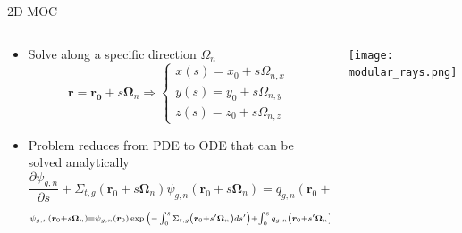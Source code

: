 
\begin{frame}[t]{2D MOC}

\begin{columns}
  \begin{column}{0.6\textwidth}
    \begin{itemize}
      \item Solve along a specific direction $\Omega_n$
      \begin{equation*}\scriptstyle
      \bm r = \bm {r_0} + s \bm \Omega_n \Rightarrow \begin{cases} 
      x\left(s\right) = x_0 + s\Omega_{n,x} \\ y\left(s\right) = y_0 + 
      s\Omega_{n,y} \\ z\left(s\right) = z_0 + s\Omega_{n,z} \end{cases}
      \end{equation*}
      \item Problem reduces from PDE to ODE that can be solved analytically
      \begin{equation*}\scriptstyle
      \frac{\partial \psi_{g,n}}{\partial s} + \Sigma_{t,g}\left(\bm r_0 + 
      s\bm\Omega_n\right)\psi_{g,n}\left(\bm r_0 + s\bm\Omega_n\right) = 
      q_{g,n}\left(\bm r_0 + s\bm\Omega_n\right)
      \end{equation*}
      \begin{dmath*}\scriptstyle
        {\psi_{g,n}\left(\bm r_0 + s\bm\Omega_n\right) = \psi_{g,n}\left(\bm 
        r_0\right)\exp{\left(-\intop_0^s \Sigma_{t,g}\left(\bm r_0 + 
        s'\bm\Omega_n\right)ds'\right)}} + {\intop_0^s q_{g,n}\left(\bm r_0 + 
        s'\bm\Omega_n\right)\exp{\left(-\intop_0^{s'} \Sigma_{t,g}\left(\bm r_0 
        + s''\bm\Omega_n\right)ds''\right)}ds'}
      \end{dmath*}
    \end{itemize}
  \end{column}
  \begin{column}{0.4\textwidth}
      \texttt{[image: modular\_rays.png]}
  \end{column}
\end{columns}

\end{frame} 


